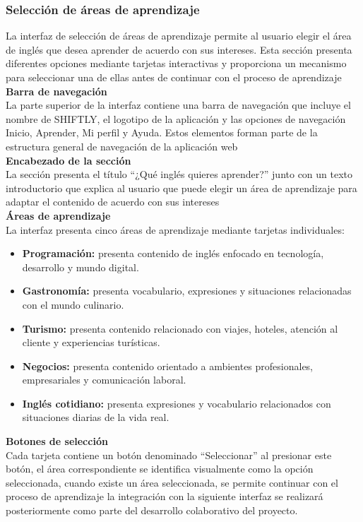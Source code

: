 \subsubsection{Selección de áreas de aprendizaje}
La interfaz de selección de áreas de aprendizaje permite al usuario elegir
el área de inglés que desea aprender de acuerdo con sus intereses. Esta
sección presenta diferentes opciones mediante tarjetas interactivas y
proporciona un mecanismo para seleccionar una de ellas antes de continuar
con el proceso de aprendizaje\\
\textbf{Barra de navegación}\\
La parte superior de la interfaz contiene una barra de navegación que
incluye el nombre de SHIFTLY, el logotipo de la aplicación y las opciones
de navegación Inicio, Aprender, Mi perfil y Ayuda. Estos elementos forman
parte de la estructura general de navegación de la aplicación web\\
\textbf{Encabezado de la sección}\\
La sección presenta el título ``¿Qué inglés quieres aprender?'' junto con
un texto introductorio que explica al usuario que puede elegir un área de
aprendizaje para adaptar el contenido de acuerdo con sus intereses\\
\textbf{Áreas de aprendizaje}\\
La interfaz presenta cinco áreas de aprendizaje mediante tarjetas
individuales:
\begin{itemize}
\item \textbf{Programación:} presenta contenido de inglés enfocado en tecnología, desarrollo y mundo digital.
\item \textbf{Gastronomía:} presenta vocabulario, expresiones y situaciones relacionadas con el mundo culinario.
\item \textbf{Turismo:} presenta contenido relacionado con viajes, hoteles, atención al cliente y experiencias turísticas.
\item \textbf{Negocios:} presenta contenido orientado a ambientes profesionales, empresariales y comunicación laboral.
\item \textbf{Inglés cotidiano:} presenta expresiones y vocabulario relacionados con situaciones diarias de la vida real.
\end{itemize}
\textbf{Botones de selección}\\
Cada tarjeta contiene un botón denominado ``Seleccionar'' al presionar
este botón, el área correspondiente se identifica visualmente como la
opción seleccionada, cuando existe un área seleccionada, se permite continuar con el proceso de aprendizaje la integración con la siguiente interfaz se realizará posteriormente como parte del desarrollo colaborativo del proyecto.\\
